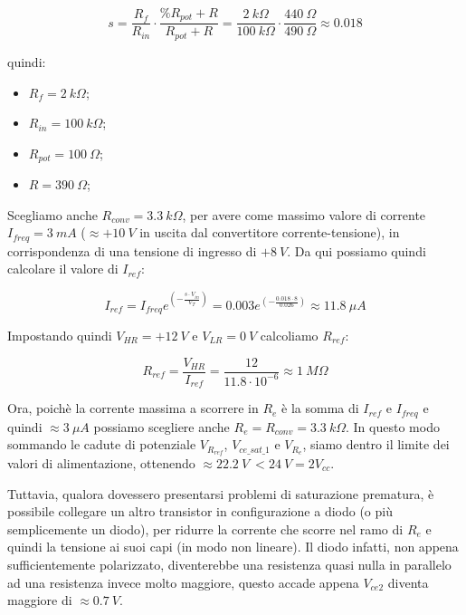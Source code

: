 \begin{displaymath}
    s=\frac{R_f}{R_{in}}\cdot\frac{\%R_{pot}+R}{R_{pot}+R}
    =\frac{2\ k\Omega}{100\ k\Omega}\cdot\frac{440\ \Omega}{490\ \Omega}
    \approx 0.018
\end{displaymath}

quindi:

\begin{itemize}
    \item $R_f = 2\ k\Omega$;
    \item $R_{in} = 100\ k\Omega$;
    \item $R_{pot} = 100\ \Omega$;
    \item $R = 390\ \Omega$;
\end{itemize}

Scegliamo anche $R_{conv}=3.3\ k\Omega$, per avere come massimo valore di corrente
$I_{freq} = 3\ mA$ ($\approx+10\ V$ in uscita dal convertitore corrente-tensione),
in corrispondenza di una tensione di ingresso di $+8\ V$. Da qui possiamo quindi calcolare
il valore di $I_{ref}$:

\begin{displaymath}
    I_{ref}=I_{freq}e^{\left(-\frac{s\cdot V_{in}}{V_T}\right)}
    =0.003e^{\left(-\frac{0.018\cdot8}{0.026}\right)}
    \approx11.8\ \mu A
\end{displaymath}

Impostando quindi $V_{HR}=+12\ V$ e $V_{LR}=0\ V$ calcoliamo $R_{ref}$:

\begin{displaymath}
    R_{ref}=\frac{V_{HR}}{I_{ref}}=\frac{12}{11.8\cdot10^{-6}}\approx 1\ M\Omega
\end{displaymath}

Ora, poichè la corrente massima a scorrere in $R_e$ è la somma di $I_{ref}$ e $I_{freq}$
e quindi $\approx3\ \mu A$ possiamo scegliere anche $R_e=R_{conv}=3.3\ k\Omega$. In questo
modo sommando le cadute di potenziale $V_{R_{ref}}$, $V_{ce\_sat\_1}$ e $V_{R_e}$, siamo
dentro il limite dei valori di alimentazione, ottenendo $\approx 22.2\ V\ < 24\ V= 2V_{cc}$.

Tuttavia, qualora dovessero presentarsi problemi di saturazione prematura, è possibile
collegare un altro transistor in configurazione a diodo (o più semplicemente un diodo), per
ridurre la corrente che scorre nel ramo di $R_e$ e quindi la tensione ai suoi capi (in modo
non lineare). Il diodo infatti, non appena sufficientemente polarizzato, diventerebbe una
resistenza quasi nulla in parallelo ad una resistenza invece molto maggiore, questo accade
appena $V_{ce2}$ diventa maggiore di $\approx0.7\ V$.

